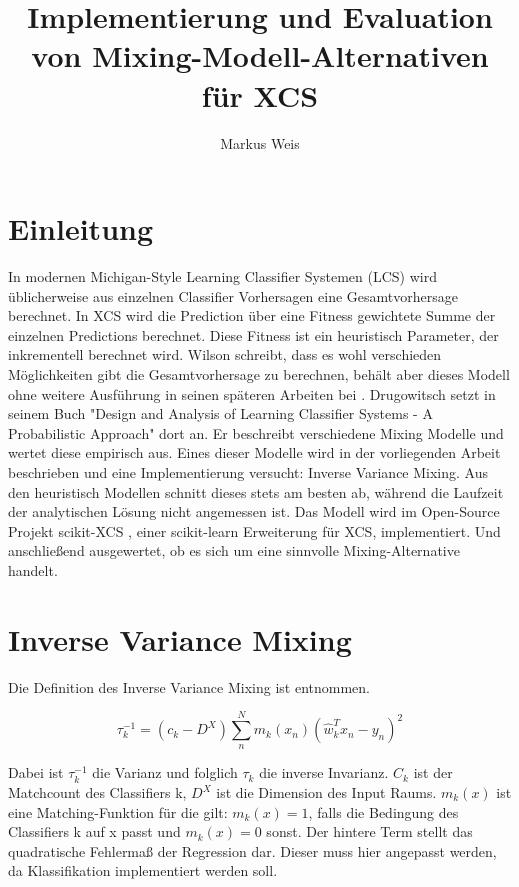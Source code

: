 \documentclass{ocsmnar}
\begin{document}
\title{Implementierung und Evaluation von Mixing-Modell-Alternativen für XCS}


\author{Markus Weis}

\maketitle




\section{Einleitung}
In modernen Michigan-Style Learning Classifier Systemen (LCS) wird üblicherweise aus einzelnen Classifier Vorhersagen eine Gesamtvorhersage berechnet. In XCS wird die Prediction über eine Fitness gewichtete Summe der einzelnen Predictions berechnet. Diese Fitness ist ein heuristisch Parameter, der inkrementell berechnet wird. Wilson schreibt, dass es wohl verschieden Möglichkeiten gibt die Gesamtvorhersage zu berechnen, behält aber dieses Modell ohne weitere Ausführung in seinen späteren Arbeiten bei \cite{Wilson95}. 
Drugowitsch setzt in seinem Buch "Design and Analysis of Learning Classifier Systems - A Probabilistic Approach" \cite{book} dort an. Er beschreibt verschiedene Mixing Modelle und wertet diese empirisch aus. 
Eines dieser Modelle wird in der vorliegenden Arbeit beschrieben und eine Implementierung versucht: Inverse Variance Mixing. Aus den heuristisch Modellen schnitt dieses stets am besten ab, während die Laufzeit der  analytischen Lösung nicht angemessen ist. Das Modell wird im Open-Source Projekt scikit-XCS \cite{repo}, einer scikit-learn Erweiterung für XCS, implementiert. Und anschließend ausgewertet, ob es sich um eine sinnvolle Mixing-Alternative handelt.

\section{Inverse Variance Mixing}
Die Definition des Inverse Variance Mixing ist \cite{book} entnommen. 

$$ \tau_{k}^{-1} = (c_{k} - D^{X}) \sum_{n}^{N} m_{k}(x_{n}) (\hat{w}_{k}^T x_{n} - y_{n})^{2}$$

Dabei ist $\tau_{k}^{-1}$ die Varianz und folglich $\tau_{k}$ die inverse Invarianz. $C_{k}$ ist der Matchcount des Classifiers k, $D^{X}$ ist die Dimension des Input Raums. $m_{k}(x)$ ist eine Matching-Funktion für die gilt: $m_{k}(x) = 1$, falls die Bedingung des Classifiers k auf x passt und $m_{k}(x) = 0$ sonst. 
Der hintere Term stellt das quadratische Fehlermaß der Regression dar. Dieser muss hier angepasst  werden, da Klassifikation implementiert werden soll.
\end{document}
